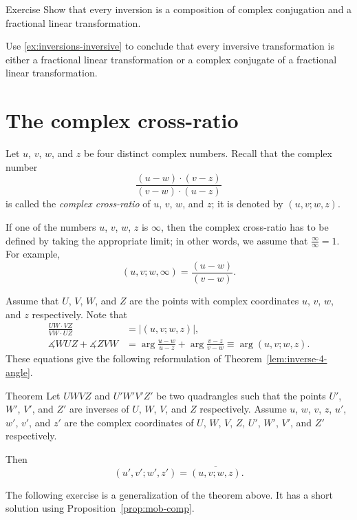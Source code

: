 \begin{thm}{Exercise}\label{ex:inversion-Mob}
Show that every inversion is a composition of complex conjugation and a fractional linear transformation.

Use \ref{ex:inversions-inversive} to conclude that every inversive transformation is either a fractional linear transformation or a complex conjugate of a fractional linear transformation.
\end{thm}

\section{The complex cross-ratio}

Let $u$, $v$, $w$, and $z$ be four distinct complex numbers.
Recall that 
the complex number
$$
\frac{(u-w)\cdot(v-z)}{(v-w)\cdot(u-z)}$$
is called the \emph{complex cross-ratio} of $u$, $v$, $w$, and $z$; 
it is denoted by $(u,v;w,z)$.

If one of the numbers $u$, $v$, $w$, $z$ is $\infty$, 
then the complex cross-ratio has to be defined by taking the appropriate limit; in other words, we assume that $\frac\infty\infty=1$.
For example,
$$(u, v; w, \infty)=\frac{(u-w)}{(v-w)}.$$

Assume that $U$, $V$, $W$, and  $Z$ are the points with complex coordinates  
$u$, $v$, $w$, and $z$ respectively.
Note that 
\begin{align*}
\frac{UW\cdot VZ}{VW\cdot UZ}&=|(u,v;w,z)|,
\\
\measuredangle WUZ +\measuredangle ZVW&=\arg\frac{u-w}{u-z}+\arg\frac{v-z}{v-w}\equiv \arg(u,v;w,z).
\end{align*}
These equations give the following reformulation of Theorem~\ref{lem:inverse-4-angle}.

\begin{thm}{Theorem}\label{lem:inverse-4-angle-C}
Let $UWVZ$ and $U'W'V'Z'$  be two quadrangles 
such that the points $U'$, $W'$, $V'$, and $Z'$ are inverses of $U$, $W$, $V$, and $Z$ respectively.
Assume $u$, $w$, $v$, $z$, $u'$, $w'$, $v'$, and $z'$ are the complex coordinates of $U$, $W$, $V$, $Z$, $U'$, $W'$, $V'$, and $Z'$ respectively.

Then 
$$(u',v';w',z')=\overline{(u,v;w,z)}.$$

\end{thm}

The following exercise is a generalization of the theorem above.
It has a short solution using Proposition~\ref{prop:mob-comp}.

